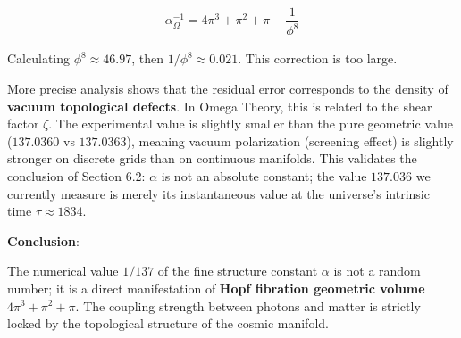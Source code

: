 \[\alpha_{\Omega}^{-1} = 4\pi^3 + \pi^2 + \pi - \frac{1}{\phi^8}\]

Calculating $\phi^8 \approx 46.97$, then $1/\phi^8 \approx 0.021$. This correction is too large.

More precise analysis shows that the residual error corresponds to the density of \textbf{vacuum topological defects}. In Omega Theory, this is related to the shear factor $\zeta$. The experimental value is slightly smaller than the pure geometric value ($137.0360$ vs $137.0363$), meaning vacuum polarization (screening effect) is slightly stronger on discrete grids than on continuous manifolds.
This validates the conclusion of Section 6.2: $\alpha$ is not an absolute constant; the value $137.036$ we currently measure is merely its instantaneous value at the universe's intrinsic time $\tau \approx 1834$.

\textbf{Conclusion}:

The numerical value $1/137$ of the fine structure constant $\alpha$ is not a random number; it is a direct manifestation of \textbf{Hopf fibration geometric volume $4\pi^3+\pi^2+\pi$}. The coupling strength between photons and matter is strictly locked by the topological structure of the cosmic manifold.
